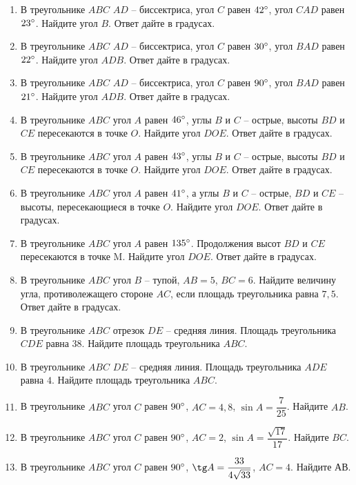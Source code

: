 \documentclass[12pt, a4paper]{article}
\begin{document}
\begin{enumerate}
		\item В треугольнике \( ABC \) \( AD \) – биссектриса, угол \( C \) равен \( 42\degree \), угол \( CAD \) равен \( 23 \degree\). Найдите угол \( B \). Ответ дайте в градусах.
		\item  В треугольнике \( ABC \) \( AD \) – биссектриса, угол \( C \) равен \( 30\degree \), угол \( BAD \) равен \( 22\degree \). Найдите угол \( ADB \). Ответ дайте в градусах.
		\item В треугольнике \( ABC \) \( AD \) – биссектриса, угол \( C \) равен \( 90\degree \), угол \( BAD \) равен \( 21\degree \). Найдите угол \( ADB \). Ответ дайте в градусах.
		\item В треугольнике \( ABC \) угол \( A \) равен \( 46\degree \), углы \( B \) и \( C \) – острые, высоты \( BD \) и \( CE \) пересекаются в точке \( O \). Найдите угол \( DOE \). Ответ дайте в градусах.
		\item В треугольнике \( ABC \) угол \( A \) равен \( 43\degree \), углы \( B \) и \( C \)  – острые, высоты \( BD \) и \( CE \) пересекаются в точке \( O \). Найдите угол \( DOE \). Ответ дайте в градусах.
		\item В треугольнике \( ABC \) угол \( A \) равен \( 41 \degree\), а углы \( B \) и \( C \) – острые, \( BD \) и \( CE \) – высоты, пересекающиеся в точке \(O\). Найдите угол \(DOE\). Ответ дайте в градусах.
		\item В треугольнике \( ABC \) угол \( A \) равен \( 135\degree \). Продолжения высот \( BD \) и \( CE \) пересекаются в точке M. Найдите угол \( DOE \). Ответ дайте в градусах.
		\item В треугольнике \( ABC \) угол \( B \) – тупой, \(AB=5\), \(BC=6\). Найдите величину угла, противолежащего стороне \( AC \), если площадь треугольника равна \( 7,5 \). Ответ дайте в градусах.
		\item В треугольнике \( ABC \) отрезок \( DE \) – средняя линия. Площадь треугольника \( CDE \) равна \( 38 \). Найдите площадь треугольника \( ABC \).
		\item В треугольнике \( ABC \) \(  DE \) – средняя линия. Площадь треугольника \( ADE \) равна \( 4 \). Найдите площадь треугольника \( ABC \).
		\item В треугольнике \( ABC \) угол \( C \) равен \( 90\degree \), \( AC=4,8 \),  \( \sin A=\dfrac{7}{25} \). Найдите \( AB \).
		\item В треугольнике \( ABC \) угол \( C \) равен \( 90 \degree \), \( AC=2 \),  \( \sin A=\dfrac{\sqrt{17}}{17} \). Найдите \( BC \).
		\item В треугольнике \( ABC \) угол \( C \) равен \( 90 \degree \), \( \tg A=\dfrac{33}{4\sqrt{33}} \), \( AC=4 \). Найдите \( АВ \).

\end{enumerate}
\end{document}
